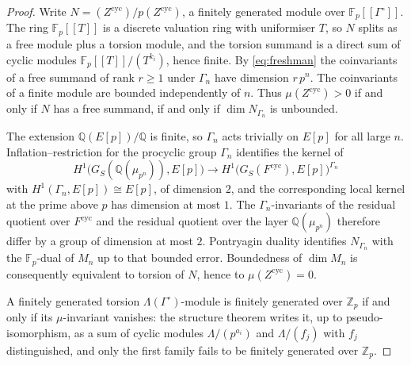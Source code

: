 \documentclass[11pt]{article}
\theoremstyle{definition}
\theoremstyle{remark}
\newcommand{\Z}{\mathbb{Z}}
\newcommand{\Q}{\mathbb{Q}}
\newcommand{\F}{\mathbb{F}}
\newcommand{\cyc}{\mathrm{cyc}}
\newcommand{\Lam}{\Lambda}
\newcommand{\Gam}{\Gamma^{\circ}}
\begin{document}
\begin{proof}
Write \(N=(Z^{\cyc})/p(Z^{\cyc})\), a finitely generated module over \(\F_p[[\Gam]]\). The ring \(\F_p[[T]]\) is a discrete valuation ring with uniformiser \(T\), so \(N\) splits as a free module plus a torsion module, and the torsion summand is a direct sum of cyclic modules \(\F_p[[T]]/(T^{k_i})\), hence finite. By \eqref{eq:freshman} the coinvariants of a free summand of rank \(r\ge 1\) under \(\Gamma_n\) have dimension \(r\,p^n\). The coinvariants of a finite module are bounded independently of \(n\). Thus \(\mu(Z^{\cyc})>0\) if and only if \(N\) has a free summand, if and only if \(\dim N_{\Gamma_n}\) is unbounded.

The extension \(\Q(E[p])/\Q\) is finite, so \(\Gamma_n\) acts trivially on \(E[p]\) for all large \(n\). Inflation--restriction for the procyclic group \(\Gamma_n\) identifies the kernel of
\[
H^1\bigl(G_S(\Q(\mu_{p^n})),E[p]\bigr)
\to
H^1\bigl(G_S(F^{\cyc}),E[p]\bigr)^{\Gamma_n}
\]
with \(H^1(\Gamma_n,E[p])\cong E[p]\), of dimension \(2\), and the corresponding local kernel at the prime above \(p\) has dimension at most \(1\). The \(\Gamma_n\)-invariants of the residual quotient over \(F^{\cyc}\) and the residual quotient over the layer \(\Q(\mu_{p^n})\) therefore differ by a group of dimension at most \(2\). Pontryagin duality identifies \(N_{\Gamma_n}\) with the \(\F_p\)-dual of \(M_n\) up to that bounded error. Boundedness of \(\dim M_n\) is consequently equivalent to torsion of \(N\), hence to \(\mu(Z^{\cyc})=0\).

A finitely generated torsion \(\Lam(\Gam)\)-module is finitely generated over \(\Z_p\) if and only if its \(\mu\)-invariant vanishes: the structure theorem writes it, up to pseudo-isomorphism, as a sum of cyclic modules \(\Lam/(p^{a_i})\) and \(\Lam/(f_j)\) with \(f_j\) distinguished, and only the first family fails to be finitely generated over \(\Z_p\).
\end{proof}
\end{document}
